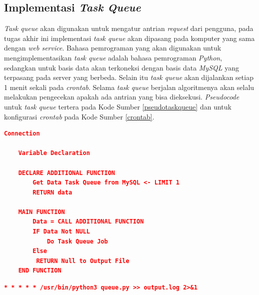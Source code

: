 		\subsection{Implementasi \textit{Task Queue}}
			\textit{Task queue} akan digunakan untuk mengatur antrian \textit{request} dari pengguna, pada tugas akhir ini implementasi \textit{task queue} akan dipasang pada komputer yang sama dengan \textit{web service}. Bahasa pemrograman yang akan digunakan untuk mengimplementasikan \textit{task queue} adalah bahasa pemrograman \textit{Python}, sedangkan untuk basis data akan terkoneksi dengan basis data \textit{MySQL} yang terpasang pada server yang berbeda. Selain itu \textit{task queue} akan dijalankan setiap 1 menit sekali pada \textit{crontab}. Selama \textit{task queue} berjalan algoritmenya akan selalu melakukan pengecekan apakah ada antrian yang bisa dieksekusi. \textit{Pseudocode} untuk \textit{task queue} tertera pada Kode Sumber \ref{pseudotaskqueue} dan untuk konfigurasi \textit{crontab} pada Kode Sumber \ref{crontab}. \\
			
			\begin{lstlisting}[frame=single,tabsize=2,breaklines,caption={\textit{Pseudocode task queue} },label=pseudotaskqueue, captionpos=b, language=json]
	Connection
	
	Variable Declaration

	DECLARE ADDITIONAL FUNCTION
		Get Data Task Queue from MySQL <- LIMIT 1
		RETURN data
	
	MAIN FUNCTION
		Data = CALL ADDITIONAL FUNCTION
		IF Data Not NULL
			Do Task Queue Job
		Else
		 RETURN Null to Output File
	END FUNCTION
			\end{lstlisting}
			
			\begin{lstlisting}[frame=single,tabsize=2,breaklines,caption={Konfigurasi \textit{crontab} },label=crontab, captionpos=b, language=json]
	* * * * * /usr/bin/python3 queue.py >> output.log 2>&1
			\end{lstlisting}